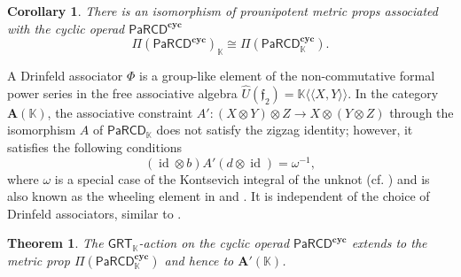 \documentclass{amsart}
\newcommand{\bA}{\mathbf{A}}
\newcommand{\kk}{\mathbb{K}}    %
\newcommand{\PaRCD}{\mathsf{PaRCD}}
\newcommand{\hPaRCD}{{\PaRCD}_{\kk}}
\newcommand{\cyc}{\mathbf{cyc}}
\newcommand{\id}{\operatorname{id}}
\newcommand{\lrar}{\ensuremath{\longrightarrow}}
\newcommand{\GRT}{{\mathsf{GRT}}}
\newcommand{\ff}{\mathfrak{f}}
\newtheorem{thm}[theorem]{Theorem}%
\newtheorem{cor}[theorem]{Corollary}%
\theoremstyle{definition}
\numberwithin{equation}{section}
\begin{document}
\begin{cor}
There is an isomorphism of prounipotent metric props associated with the cyclic operad $\PaRCD^{\cyc}$ 
\[{\Pi(\PaRCD^{\cyc})}_{\kk} \cong \Pi({\PaRCD}^{\cyc}_{\kk}).\]
\end{cor}

A Drinfeld associator $\Phi$ is a group-like element of the non-commutative formal power series in the free associative algebra $ \hat{U}(\ff_2) = \kk\langle \langle X,Y\rangle\rangle$. In the category $\bA(\kk)$, the associative constraint $A': (X \otimes Y) \otimes Z \lrar X \otimes (Y \otimes Z)$ through the isomorphism $A$ of $\hPaRCD$ does not satisfy the zigzag identity; however, it satisfies the following conditions \begin{equation}\label{eq: Kontsevich Integral of unknot}
(\id \otimes b)A' (d \otimes \id) = \omega^{-1}, \end{equation} where $\omega$ is a special case of the Kontsevich integral of the unknot (cf. \cite{BN_weak_tangles, Le_Murakami_1996, KT_Tangles}) and is also known as the wheeling element in \cite{BNLT} and \cite{knot_theory_book}. It is independent of the choice of Drinfeld associators, similar to \cite[Theorem 8]{Le_Murakami_1996}.

\begin{thm}\label{prop: GRT action on metric prop}
The $\GRT_{\kk}$-action on the cyclic operad $\PaRCD^{\cyc}$ extends to the metric prop $\Pi(\hPaRCD^{\cyc})$ and hence to $\bA'(\kk)$.
\end{thm} 
\end{document}
